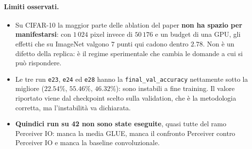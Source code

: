 \documentclass[
  11pt,
]{article}
\begin{document}
\paragraph{Limiti osservati.}
\begin{itemize}
\item Su CIFAR-10 la maggior parte delle ablation del paper \textbf{non ha spazio per manifestarsi}: con $1\,024$ pixel invece di $50\,176$ e un budget di una GPU, gli effetti che su ImageNet valgono $7$ punti qui cadono dentro $2.78$. Non è un difetto della replica: è il regime sperimentale che cambia le domande a cui si può rispondere.
\item Le tre run \texttt{e23}, \texttt{e24} ed \texttt{e28} hanno la \texttt{final\_val\_accuracy} nettamente sotto la migliore ($22.54\%$, $55.46\%$, $46.32\%$): sono instabili a fine training. Il valore riportato viene dal checkpoint scelto sulla validation, che è la metodologia corretta, ma l'instabilità va dichiarata.
\item \textbf{Quindici run su 42 non sono state eseguite}, quasi tutte del ramo Perceiver IO: manca la media GLUE, manca il confronto Perceiver contro Perceiver IO e manca la baseline convoluzionale.
\end{itemize}
\end{document}
